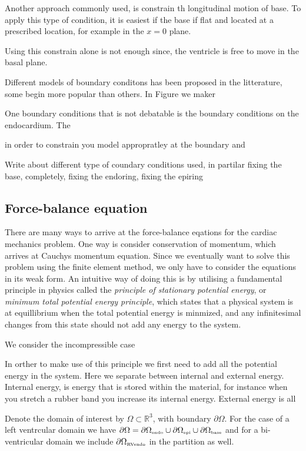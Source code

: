 Another approach commonly used, is constrain th longitudinal motion of
base. To apply this type of condition, it is easiest if the base if
flat and located at a prescribed location, for example in the $x= 0$ plane. 



Using this
constrain alone is not enough since, the ventricle is free to move in
the basal plane.



Different
models of boundary conditons has been proposed in the litterature,
some begin more popular than others. In Figure we maker



One boundary conditions that is
not debatable is the boundary conditions on the endocardium. The 



in order to constrain you model appropratley at the boundary
and 

Write about different type of coundary conditions used, in partilar
fixing the base, completely, fixing the endoring, fixing the epiring



\subsection{Force-balance equation}
There are many ways to arrive at the force-balance eqations for the
cardiac mechanics problem. One way is consider conservation of
momentum, which arrives at Cauchys momentum equation. Since we
eventually want to solve this problem using the finite element method,
we only have to consider the equations in its weak form. An intuitive
way of doing this is by utilising a fundamental principle in physics
called the \emph{principle of stationary potential energy}, or
\emph{minimum total potential energy principle}, which states that a
physical system is at equillibrium when the total potential energy is
minmized, and any infinitesimal changes from this state should not add
any energy to the system.

We consider the incompressible case

In orther to make use of this principle we first need to add all the
potential energy in the system. Here we separate between internal and
external energy. Internal energy, is energy that is stored within the
material, for instance when you stretch a rubber band you increase its
internal energy. External energy is all

Denote the domain of interest by $\Omega \subset \mathbb{R}^3$, with
boundary $\partial \Omega$. For the case of a left ventrcular domain
we have $\partial \Omega = \partial \Omega_{ \textnormal{\tiny \text{endo}}} \cup \partial \Omega_{ \textnormal{\tiny \text{epi}}} \cup \partial \Omega_{ \textnormal{\tiny\text{base}}}$ and for a
bi-ventricular domain we include $\partial \Omega_{ \textnormal{\tiny\text{RVendo}}}$ in the partition as well.


